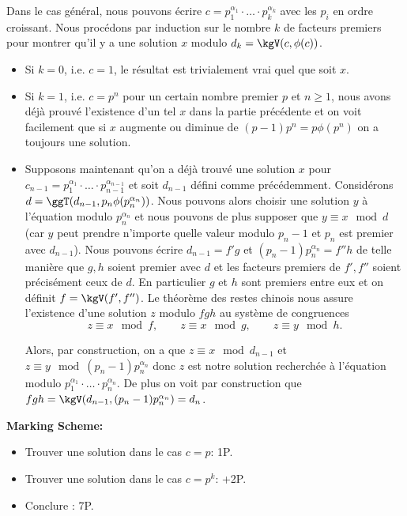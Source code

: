 \documentclass[language=german,style=solution]{smo}
\begin{document}
\begin{enumerate}
Dans le cas général, nous pouvons écrire $c = p_1^{\alpha_1}\cdot\ldots \cdot p_k^{\alpha_k}$ avec les $p_i$ en ordre croissant. Nous procédons par induction sur le nombre $k$ de facteurs premiers pour montrer qu'il y a une solution $x$ modulo $d_k = \kgV(c, \phi(c))$.
\begin{itemize}
	\item Si $k = 0$, i.e. $c = 1$, le résultat est trivialement vrai quel que soit $x$.
	\item Si $k = 1$, i.e. $c = p^n$ pour un certain nombre premier $p$ et $n \geq 1$, nous avons déjà prouvé l'existence d'un tel $x$ dans la partie précédente et on voit facilement que si $x$ augmente ou diminue de $(p-1)p^{n} = p\phi(p^n)$ on a toujours une solution.
	\item Supposons maintenant qu'on a déjà trouvé une solution $x$ pour $c_{n-1} = p_1^{\alpha_1}\cdot\ldots\cdot p_{n-1}^{\alpha_{n-1}}$ et soit $d_{n-1}$ défini comme précédemment. Considérons $d = \ggT(d_{n-1}, p_n\phi(p_n^{\alpha_n}))$. Nous pouvons alors choisir une solution $y$ à l'équation modulo $p_n^{\alpha_n}$ et nous pouvons de plus supposer que $y\equiv x \mod{d}$ (car $y$ peut prendre n'importe quelle valeur modulo $p_n - 1$ et $p_n$ est premier avec $d_{n-1}$). Nous pouvons écrire $d_{n-1} = f'g$ et $(p_n - 1)p_n^{\alpha_n} = f'' h$ de telle manière que $g, h$ soient premier avec $d$ et les facteurs premiers de $f',f''$ soient précisément ceux de $d$. En particulier $g$ et $h$ sont premiers entre eux et on définit $f = \kgV(f', f'')$. Le théorème des restes chinois nous assure l'existence d'une solution $z$ modulo $fgh$ au système de congruences
	\[
		z\equiv x \mod{f},\qquad z\equiv x \mod g,\qquad z\equiv y \mod h.
	\]
	
	Alors, par construction, on a que $z\equiv x \mod{d_{n-1}}$ et $z\equiv y \mod{(p_n - 1)p_n^{\alpha_n}}$ donc $z$ est notre solution recherchée à l'équation modulo $p_1^{\alpha_1}\cdot\ldots\cdot p_n^{\alpha_n}$. De plus on voit par construction que $fgh = \kgV(d_{n-1}, (p_n - 1)p_n^{\alpha_n}) = d_n$.
\end{itemize}

\textbf{Marking Scheme:}
\begin{itemize}
\item Trouver une solution dans le cas $c=p$: \hfill 1P.
\item Trouver une solution dans le cas $c=p^k$: \hfill +2P.
\item Conclure : \hfill 7P.
\end{itemize}


\end{enumerate}
\end{document}
